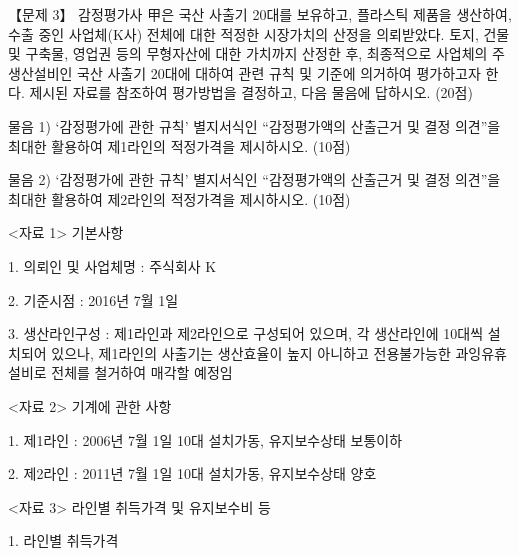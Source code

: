 \begin{longquestion}{【문제 3】}
감정평가사 甲은 국산 사출기 20대를 보유하고, 플라스틱 제품을 생산하여, 수출 중인 사업체(K사) 전체에 대한 적정한 시장가치의 산정을 의뢰받았다. 토지, 건물 및 구축물, 영업권 등의 무형자산에 대한 가치까지 산정한 후, 최종적으로 사업체의 주 생산설비인 국산 사출기 20대에 대하여 관련 규칙 및 기준에 의거하여 평가하고자 한다. 제시된 자료를 참조하여 평가방법을 결정하고, 다음 물음에 답하시오. (20점) \par
\medskip\noindent 물음 1) ‘감정평가에 관한 규칙’ 별지서식인 “감정평가액의 산출근거 및 결정 의견”을 최대한 활용하여 제1라인의 적정가격을 제시하시오. (10점) \par
\medskip\noindent 물음 2) ‘감정평가에 관한 규칙’ 별지서식인 “감정평가액의 산출근거 및 결정 의견”을 최대한 활용하여 제2라인의 적정가격을 제시하시오. (10점) \par
<자료 1> 기본사항 \par
1. 의뢰인 및 사업체명 : 주식회사 K \par
2. 기준시점 : 2016년 7월 1일 \par
3. 생산라인구성 : 제1라인과 제2라인으로 구성되어 있으며, 각 생산라인에 10대씩 설치되어 있으나, 제1라인의 사출기는 생산효율이 높지 아니하고 전용불가능한 과잉유휴설비로 전체를 철거하여 매각할 예정임 \par
<자료 2> 기계에 관한 사항 \par
1. 제1라인 : 2006년 7월 1일 10대 설치가동, 유지보수상태 보통이하 \par
2. 제2라인 : 2011년 7월 1일 10대 설치가동, 유지보수상태 양호 \par
<자료 3> 라인별 취득가격 및 유지보수비 등 \par
1. 라인별 취득가격 \par
{\small\centering
{}\par}


\end{longquestion}
